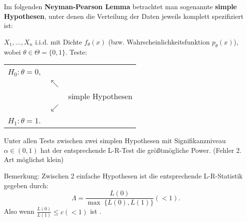 \documentclass{tstextbook}
\begin{document}
Im folgenden \textbf{Neyman-Pearson Lemma} betrachtet man sogenannte \textbf{simple Hypothesen}, unter denen die Verteilung der Daten jeweils komplett spezifiziert ist:

$ X_1,\ldots,X_n $ i.i.d. mit Dichte $ f_\theta(x) $ (bzw. Wahrscheinlichkeitsfunktion $ p_\theta(x) $), wobei $ \theta\in\Theta=\{0,1\} $. Teste:

	\begin{center}
	\begin{tabular}{lll}
		$ H_0\colon\theta=0 $, & & \\
		& $ \nwarrow $ & \\
		&& simple Hypothesen \\
		& $ \swarrow $ & \\
		$ H_1\colon\theta=1 $.
	\end{tabular}
	\end{center}

\begin{satz}
	Unter allen Tests zwischen zwei simplen Hypothesen mit Signifikanzniveau $ \alpha\in(0,1) $ hat der entsprechende L-R-Test die größtmögliche Power. (Fehler 2. Art möglichst klein)
\end{satz}

\begin{remark}
	Bemerkung:  Zwischen 2 einfache Hypothesen ist die entsprechende L-R-Statistik gegeben durch:   
	\[
	\Lambda = \frac{L(0)}{\max\;\{L(0),L(1)\}} (<1). 
	\]
	Also wenn $ \frac{L(0)}{L(1)} \le c(<1)  $ ist .
\end{remark}
\end{document}
